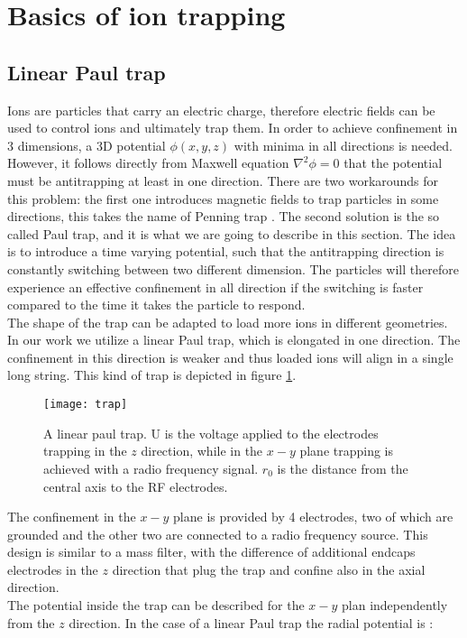 \section{Basics of ion trapping}
\subsection{Linear Paul trap}
Ions are particles that carry an electric charge, therefore electric fields can be used to control ions and ultimately trap them. In order to achieve confinement in 3 dimensions, a 3D potential $\phi(x,y,z)$ with minima in all directions is needed. However, it follows directly from Maxwell equation $\nabla^2 \phi = 0$ that the potential must be antitrapping at least in one direction. There are two workarounds for this problem: the first one introduces magnetic fields to trap particles in some directions, this takes the name of Penning trap \cite{RevModPhys.58.233}. The second solution is the so called Paul trap, and it is what we are going to describe in this section. The idea is to introduce a time varying potential, such that the antitrapping direction is constantly switching between two different dimension. The particles will therefore experience an effective confinement in all direction if the switching is faster compared to the time it takes the particle to respond.\\
The shape of the trap can be adapted to load more ions in different geometries. In our work we utilize a linear Paul trap, which is elongated in one direction. The confinement in this direction is weaker and thus loaded ions will align in a single long string. This kind of trap is depicted in figure \ref{trap}.
\begin{figure}[H]
\centering
\texttt{[image: trap]}
\caption{A linear paul trap. U is the voltage applied to the electrodes trapping in the $z$ direction, while in the $x-y$ plane trapping is achieved with a radio frequency signal. $r_0$ is the distance from the central axis to the RF electrodes.}
\label{trap}
\end{figure}
The confinement in the $x-y$ plane is provided by 4 electrodes, two of which are grounded and the other two are connected to a radio frequency source. This design is similar to a mass filter, with the difference of additional endcaps electrodes in the $z$ direction that plug the trap and confine also in the axial direction.\\
The potential inside the trap can be described for the $x-y$ plan independently from the $z$ direction. In the case of a linear Paul trap the radial potential is \cite{traptheory}:
